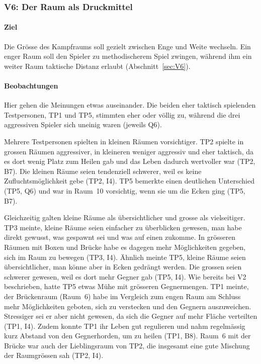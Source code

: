 \documentclass[../Main.tex]{subfiles}
\begin{document}
\subsubsection{V6: Der Raum als Druckmittel}

\paragraph{Ziel}
Die Grösse des Kampfraums soll gezielt zwischen Enge und Weite wechseln. Ein enger Raum soll den Spieler zu methodischerem Spiel zwingen, während ihm ein weiter Raum taktische Distanz erlaubt (Abschnitt~\ref{sec:V6}).

\paragraph{Beobachtungen}
Hier gehen die Meinungen etwas auseinander. Die beiden eher taktisch spielenden Testpersonen, TP1 und TP5, stimmten eher oder völlig zu, während die drei aggressiven Spieler sich uneinig waren (jeweils Q6).

Mehrere Testpersonen spielten in kleinen Räumen vorsichtiger. TP2 spielte in grossen Räumen aggressiver, in kleineren weniger aggressiv und eher taktisch, da es dort wenig Platz zum Heilen gab und das Leben dadurch wertvoller war (TP2, B7). Die kleinen Räume seien tendenziell schwerer, weil es keine Zufluchtsmöglichkeit gebe (TP2, I4). TP5 bemerkte einen deutlichen Unterschied (TP5, Q6) und war in Raum~10 vorsichtig, wenn sie um die Ecken ging (TP5, B7).

Gleichzeitig galten kleine Räume als übersichtlicher und grosse als vielseitiger. TP3 meinte, kleine Räume seien einfacher zu überblicken gewesen, man habe direkt gewusst, was gespawnt sei und was auf einen zukomme. In grösseren Räumen mit Boxen und Brücke habe es dagegen mehr Möglichkeiten gegeben, sich im Raum zu bewegen (TP3, I4). Ähnlich meinte TP5, kleine Räume seien übersichtlicher, man könne aber in Ecken gedrängt werden. Die grossen seien schwerer gewesen, weil es dort mehr Gegner gab (TP5, I4). Wie bereits bei V2 beschrieben, hatte TP5 etwas Mühe mit grösseren Gegnermengen. TP1 meinte, der Brückenraum (Raum~6) habe im Vergleich zum engen Raum am Schluss mehr Möglichkeiten geboten, sich zu verstecken und den Gegnern auszuweichen. Stressiger sei er aber nicht gewesen, da sich die Gegner auf mehr Fläche verteilten (TP1, I4). Zudem konnte TP1 ihr Leben gut regulieren und nahm regelmässig kurz Abstand von den Gegnerhorden, um zu heilen (TP1, B8). Raum~6 mit der Brücke war auch der Lieblingsraum von TP2, die insgesamt eine gute Mischung der Raumgrössen sah (TP2, I4).
\end{document}
